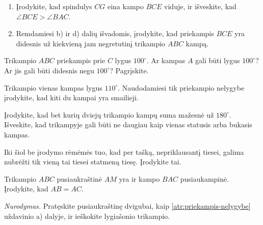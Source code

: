 \documentclass[12pt,a4paper,reqno]{amsart}
\newcommand{\krastineszymek}[1]{\tikz[baseline=(current bounding box.center)]{\foreach \x in {#1}{\draw (\x pt,-2.5pt)--(\x pt,2.5pt);}}}
\theoremstyle{plain}\newtheorem{theorem}{Teorema}[section]
\theoremstyle{definition}
\theoremstyle{remark}\newtheorem{remark}[theorem]{Pastaba}\newtheorem*{remark*}{Pastaba}
\theoremstyle{definition}\newtheorem*{problem*}{Uždavinys}
\newenvironment{starproblem}{\begingroup\let\numberwithoutstar\thetheorem\renewcommand{\thetheorem}{\numberwithoutstar\textsuperscript{*}}\begin{problem}}{\end{problem}\endgroup}
\newenvironment{staranchorproblem}{\begingroup\let\numberwithoutstar\thetheorem\renewcommand{\thetheorem}{\numberwithoutstar\textsuperscript{*}}\begin{anchorproblem}}{\end{anchorproblem}\endgroup}
\begin{document}
\begin{staranchorproblem}[Trikampio priekampio nelygybė]
\begin{enumerate}[label=\alph*),leftmargin=*]
\begin{center}
\end{center}
\item Įrodykite, kad spindulys $CG$ eina kampo $BCE$ viduje, ir išveskite, kad $\angle BCE>\angle BAC$.
\item Remdamiesi b) ir d) dalių išvadomis, įrodykite, kad priekampis $BCE$ yra didesnis už kiekvieną jam negretutinį trikampio $ABC$ kampą.
\end{enumerate}
\end{staranchorproblem}
\begin{problem}\label{uzd:priekampis-pratimai} Trikampio $ABC$ priekampis prie $C$ lygus $100^\circ$. Ar kampas $A$ gali būti lygus $100^\circ$? Ar jis gali būti didesnis negu $100^\circ$? Pagrįskite. \end{problem}
\begin{problem}\label{uzd:priekampis-taikymas} Trikampio vienas kampas lygus $110^\circ$. Naudodamiesi tik priekampio nelygybe įrodykite, kad kiti du kampai yra smailieji. \end{problem}
\begin{problem}\label{uzd:priekampis-suma} Įrodykite, kad bet kurių dviejų trikampio kampų suma mažesnė už $180^\circ$. Išveskite, kad trikampyje gali būti ne daugiau kaip vienas statusis arba bukasis kampas. \end{problem}
\begin{anchorproblem}\label{atr:statmuo} Iki šiol be įrodymo rėmėmės tuo, kad per tašką, nepriklausantį tiesei, galima nubrėžti tik vieną tai tiesei statmeną tiesę. Įrodykite tai. \end{anchorproblem}
\begin{starproblem}\label{uzd:priekampis-pusiaukrastine} Trikampio $ABC$ pusiaukraštinė $AM$ yra ir kampo $BAC$ pusiaukampinė. Įrodykite, kad $AB=AC$.
\par\emph{Nurodymas.} Pratęskite pusiaukraštinę dvigubai, kaip \ref{atr:priekampis-nelygybe} uždavinio a) dalyje, ir ieškokite lygiašonio trikampio. \end{starproblem}
\end{document}
